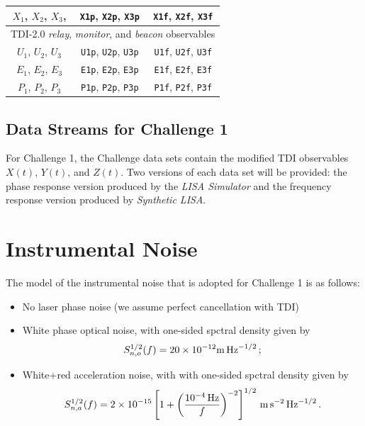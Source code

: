 \documentclass[11pt]{report}
\def\be{\begin{equation}}
\def\ee{\end{equation}}
\begin{document}
\begin{center}
\begin{tabular}{c|c|c}
$X_1$, $X_2$, $X_3$, & \texttt{X1p}, \texttt{X2p}, \texttt{X3p} & \texttt{X1f}, \texttt{X2f}, \texttt{X3f} \\
\hline
\multicolumn{3}{c}{TDI-2.0 \emph{relay}, \emph{monitor}, and \emph{beacon} observables} \\
$U_1$, $U_2$, $U_3$ & \texttt{U1p}, \texttt{U2p}, \texttt{U3p} & \texttt{U1f}, \texttt{U2f}, \texttt{U3f} \\
$E_1$, $E_2$, $E_3$ & \texttt{E1p}, \texttt{E2p}, \texttt{E3p} & \texttt{E1f}, \texttt{E2f}, \texttt{E3f} \\
$P_1$, $P_2$, $P_3$ & \texttt{P1p}, \texttt{P2p}, \texttt{P3p} & \texttt{P1f}, \texttt{P2f}, \texttt{P3f} \\
\hline \hline
\end{tabular}
\end{center}
\subsection{Data Streams for Challenge 1}
For Challenge 1, the Challenge data sets contain the modified TDI observables $X(t)$, $Y(t)$, and $Z(t)$.
Two versions of each data set will be provided: the phase response version produced by the {\it LISA Simulator} and
the  frequency response version produced by {\it Synthetic LISA}.


\section{Instrumental Noise}
\label{s:noise}
The model of the instrumental noise that is adopted for Challenge 1 is as follows:

\begin{itemize}

\item No laser phase noise (we assume perfect cancellation with TDI)

\item White phase optical noise, with one-sided spctral density given by 
\be
S_{n,o}^{1/2}(f) = 20 \times 10^{-12} {\rm m}\, {\rm Hz}^{-1/2}\,;
\label{e:Sno}
\ee

\item White+red acceleration noise, with with one-sided spctral density given by 
\be
S_{n,a}^{1/2}(f) = 2 \times 10^{-15} \left[1 + \left(\frac{10^{-4}\,{\rm Hz}}{f}\right)^{-2}\right]^{1/2}\, {\rm m}\,{\rm s}^{-2}\, {\rm Hz}^{-1/2}\,.
\label{e:Sna}
\ee

\end{itemize}
\end{document}
